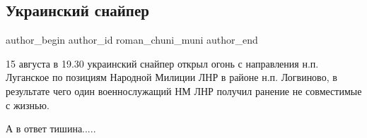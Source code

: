  
 
 
 
 
 
\subsection{Украинский снайпер}
\label{sec:16_10_2020.fb.roman_chuni_muni.1.ukr_snajper}
 
\ifcmt
 author_begin
   author_id roman_chuni_muni
 author_end
\fi

15 августа в 19.30 украинский снайпер открыл огонь с направления н.п. Луганское
по позициям Народной Милиции ЛНР в районе н.п. Логвиново, в результате чего
один военнослужащий НМ ЛНР получил ранение не совместимые с жизнью.

А в ответ тишина.....

